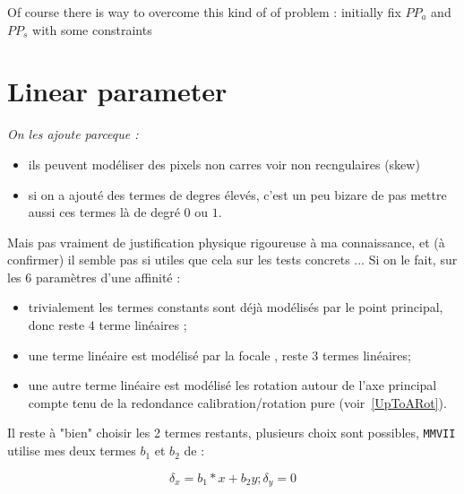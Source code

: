 Of course there is way to overcome this kind of of problem : 
initially fix $PP_a$ and $PP_s$ with some constraints


\section{Linear parameter}

\label{CalibInt:LinearParam}

{\it On les ajoute parceque :

\begin{itemize}
   \item ils peuvent modéliser des pixels non carres voir non recngulaires (skew)
   \item si on a ajouté des termes de degres élevés, c'est un peu bizare de pas mettre
         aussi ces termes là de degré $0$ ou $1$.
\end{itemize}


Mais pas vraiment de justification physique rigoureuse à ma connaissance, et (à confirmer)
il semble pas si utiles que cela sur les tests concrets  ... 
Si on le fait, sur les 6 paramètres d'une affinité :

\begin{itemize}
   \item trivialement les termes constants sont déjà modélisés par le point principal,
          donc reste $4$ terme linéaires ;

   \item une terme linéaire est modélisé par la focale , reste $3$ termes linéaires;

   \item une autre terme lin\'eaire est modélisé les rotation autour de l'axe principal
         compte tenu de la redondance calibration/rotation pure (voir~\ref{UpToARot}).
   
\end{itemize}

Il reste à "bien" choisir les 2 termes restants, plusieurs choix sont possibles, 
{\tt MMVII} utilise mes deux termes $b_1$ et $b_2$ de \cite{Fraser} :

\begin{equation}
   \delta_x = b_1 * x + b_2 y    ;  \delta_y = 0
\end{equation}

}


